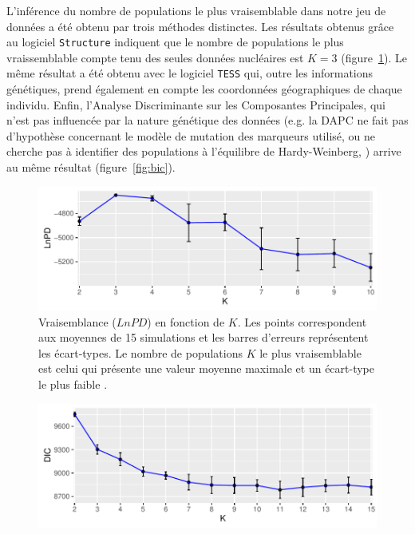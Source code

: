 \documentclass[a4paper,12pt,twoside]{article}\usepackage[]{graphicx}\usepackage[]{color}
\makeatletter
\def\maxwidth{ %
  \ifdim\Gin@nat@width>\linewidth
    \linewidth
  \else
    \Gin@nat@width
  \fi
}
\makeatother
\begin{document}
\begin {bibunit} [newbst]
L'inférence du nombre de populations le plus vraisemblable dans notre jeu de données a été obtenu par trois méthodes distinctes. Les résultats obtenus grâce au logiciel \texttt{Structure} \citep{pritchard2000} indiquent que le nombre de populations le plus vraissemblable compte tenu des seules données nucléaires est $K=3$ (figure~\ref{fig:lnpd}). Le même résultat a été obtenu avec le logiciel \texttt{TESS} \citep[][figure~\ref{fig:dic}]{durand2009} qui, outre les informations génétiques, prend également en compte les coordonnées géographiques de chaque individu. 
Enfin, l'Analyse Discriminante sur les Composantes Principales, qui n'est pas influencée par la nature génétique des données (e.g. la DAPC ne fait pas d'hypothèse concernant le modèle de mutation des marqueurs utilisé, ou ne cherche pas à identifier des populations à l'équilibre de Hardy-Weinberg, \citealp{jombart2008}) arrive au même résultat (figure~\ref{fig:bic}).

\begin{figure}[htpb]

{\centering \includegraphics[width=\maxwidth]{figure/lnpd-1} 

}

\caption[Vraisemblance ($LnPD$) en fonction de $K$.]{Vraisemblance ($LnPD$) en fonction de $K$. Les points correspondent aux moyennes de 15 simulations et les barres d'erreurs représentent les écart-types. Le nombre de populations $K$ le plus vraisemblable est celui qui présente une valeur moyenne maximale et un écart-type le plus faible \citep{pritchard2000}.}\label{fig:lnpd}
\end{figure}




\begin{figure}[htpb]

{\centering \includegraphics[width=\maxwidth]{figure/dic-1} 

}
\end{figure}
\end{bibunit}
\end{document}
